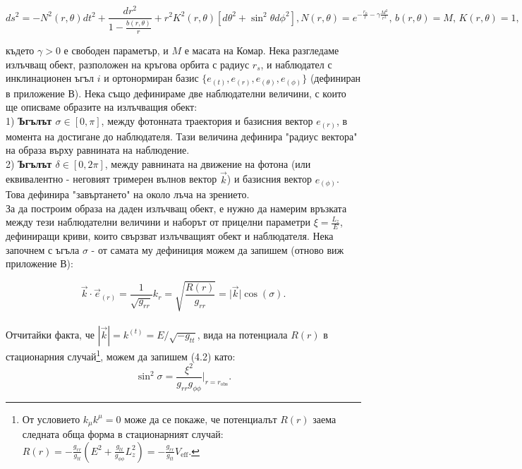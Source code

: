 \documentclass[12pt]{article}
\numberwithin{equation}{section}
\numberwithin{figure}{section}
\begin{document}
	\begin{subequations}
		\begin{equation}
			ds^2 = -N^2(r,\theta)dt^2 + \frac{dr^2}{1 - \frac{b(r,\theta)}{r}} + r^2K^2(r,\theta)\left[d\theta^2 + \sin^2\theta d\phi^2\right],
		\end{equation}
		\begin{equation}
			N(r,\theta) = e^{-\frac{r_0}{r} - \gamma\frac{M^2}{r^2}},\, b(r,\theta) = M,\, K(r,\theta) = 1,
		\end{equation}	
	\end{subequations}
	
	\noindent където $\gamma > 0$ е свободен параметър, и $M$ е масата на Комар. Нека разгледаме излъчващ обект, разположен на кръгова орбита с радиус $r_s$, и наблюдател с инклинационен ъгъл $i$ и ортонормиран базис $\{e_{(t)}, e_{(r)}, e_{(\theta)}, e_{(\phi)}\}$ (дефиниран в приложение В). Нека също дефинираме две наблюдателни величини, с които ще описваме образите на излъчващия обект:\\
	
	1) \textbf{Ъгълът $\sigma\in[0,\pi]$}, между фотонната траектория и базисния вектор $e_{(r)}$, в момента на достигане до наблюдателя. Тази величина дефинира "радиус вектора" на образа върху равнината на наблюдение.\\
	
	2) \textbf{Ъгълът $\delta\in[0,2\pi]$}, между равнината на движение на фотона (или еквивалентно - неговият тримерен вълнов вектор $\vec{k}$) и базисния вектор $e_{(\phi)}$. Това дефинира "завъртането" на около лъча на зрението.\\
	
	За да построим образа на даден излъчващ обект, е нужно да намерим връзката между тези наблюдателни величини и наборът от прицелни параметри $\xi = \frac{L_z}{E}$, дефиниращи криви, които свързват излъчващият обект и наблюдателя. Нека започнем с ъгъла $\sigma$ - от самата му дефиниция можем да запишем (отново виж приложение В):
	
	\begin{equation}
		\vec{k} \cdot \vec{e}_{(r)} = \frac{1}{\sqrt{g_{rr}}}k_{r} = \sqrt{\frac{R(r)}{g_{rr}}} =  \big\vert \vec{k}\big\vert \cos(\sigma).
	\end{equation}\\
	Отчитайки факта, че $|\vec{k}| = k^{(t)} = E/\sqrt{-g_{tt}}$,  вида на потенциала $R(r)$ в стационарния случай\footnote{От условието $k_\mu k^\mu = 0$ може да се покаже, че потенциалът $R(r)$ заема следната обща форма в стационарният случай: $R(r) = -\frac{g_{rr}}{g_{tt}}\left(E^2 + \frac{g_{tt}}{g_{\phi\phi}}L_z^2\right) = -\frac{g_{rr}}{g_{tt}} V_\text{eff}$.}, можем да запишем (4.2) като:
	\begin{equation}
		\sin^2\sigma = \frac{\xi^2}{g_{rr}g_{\phi\phi}}\bigg\vert_{r = r_\text{obs}}.
	\end{equation}
	
\end{document}
